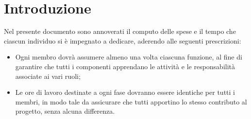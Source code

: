 \section{Introduzione}
Nel presente documento sono annoverati il computo delle spese e il tempo che ciascun
individuo si è impegnato a dedicare, aderendo alle seguenti prescrizioni:
\begin{itemize}
    \item Ogni membro dovrà assumere almeno una volta ciascuna funzione, al fine di garantire che tutti i componenti apprendano le attività e le responsabilità associate ai vari ruoli;
    \item Le ore di lavoro destinate a ogni fase dovranno essere identiche per tutti i membri, in modo tale da assicurare che tutti apportino lo stesso contributo al progetto, senza alcuna differenza.
\end{itemize}







